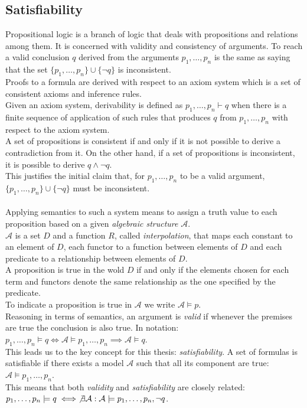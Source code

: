 \subsection{Satisfiability}

Propositional logic is a branch of logic that deals with propositions and relations among them.
It is concerned with validity and consistency of arguments.
To reach a valid conclusion $q$ derived from the arguments $p_1, \dots, p_n$ is the same as saying that the set $\{p_1, \dots, p_n\} \cup \{\neg q\}$ is inconsistent. \\
Proofs to a formula are derived with respect to an axiom system which is a set of consistent axioms and inference rules. \\
Given an axiom system, derivability is defined as $p_1, \dots, p_n \vdash q$ when there is a finite sequence of application of such rules that produces $q$ from $p_1, \dots, p_n$ with respect to the axiom system. \\
A set of propositions is consistent if and only if it is not possible to derive a contradiction from it.
On the other hand, if a set of propositions is inconsistent, it is possible to derive $q \land \neg q$. \\
This justifies the initial claim that, for $p_1, \dots, p_n$ to be a valid argument, $\{p_1, \dots, p_n\} \cup \{\neg q\}$ must be inconsistent. \\
\\
Applying semantics to such a system means to assign a truth value to each proposition based on a given \textit{algebraic structure} $\mathcal{A}$. \\
$\mathcal{A}$ is a set $D$ and a function $R$, called \textit{interpolation}, that maps each constant to an element of $D$, each functor to a function between elements of $D$ and each predicate to a relationship between elements of $D$. \\
A proposition is true in the wold $D$ if and only if the elements chosen for each term and functors denote the same relationship as the one specified by the predicate. \\
To indicate a proposition is true in $\mathcal{A}$ we write $\mathcal{A} \models p$. \\
Reasoning in terms of semantics, an argument is \textit{valid} if whenever the premises are true the conclusion is also true.
In notation: $p_1, \dots, p_n \models q \iff \mathcal{A} \models p_1, \dots, p_n \implies \mathcal{A} \models q$. \\
This leads us to the key concept for this thesis: \textit{satisfiability}.
A set of formulas is satisfiable if there exists a model $\mathcal{A}$ such that all its component are true: $\mathcal{A} \models p_1, \dots, p_n$. \\
This means that both \textit{validity} and \textit{satisfiability} are closely related: $p_1, \dots, p_n \models q \iff \not\exists \mathcal{A} : \mathcal{A} \models p_1, \dots, p_n, \neg q$. \\

